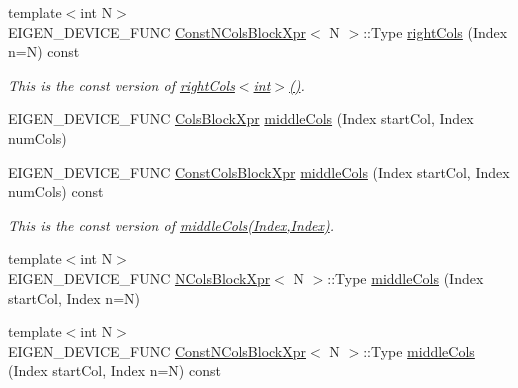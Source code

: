 \begin{DoxyCompactItemize}
\item 
\mbox{\label{class_eigen_1_1_dense_base_ab5ce663dcc3e656606ace064454e79fa}} 
{\footnotesize template$<$int N$>$ }\\E\+I\+G\+E\+N\+\_\+\+D\+E\+V\+I\+C\+E\+\_\+\+F\+U\+NC \mbox{\hyperlink{struct_eigen_1_1_dense_base_1_1_const_n_cols_block_xpr}{Const\+N\+Cols\+Block\+Xpr}}$<$ N $>$\+::Type \mbox{\hyperlink{class_eigen_1_1_dense_base_ab5ce663dcc3e656606ace064454e79fa}{right\+Cols}} (Index n=N) const
\begin{DoxyCompactList}\small\item\em This is the const version of \mbox{\hyperlink{class_eigen_1_1_dense_base_a5b0fa44c191d40a2f82260f7e5cdeaa9}{right\+Cols$<$int$>$()}}. \end{DoxyCompactList}\item 
E\+I\+G\+E\+N\+\_\+\+D\+E\+V\+I\+C\+E\+\_\+\+F\+U\+NC \mbox{\hyperlink{class_eigen_1_1_block}{Cols\+Block\+Xpr}} \mbox{\hyperlink{class_eigen_1_1_dense_base_a3fc39624015c1702d22ebb322aa9ebce}{middle\+Cols}} (Index start\+Col, Index num\+Cols)
\item 
\mbox{\label{class_eigen_1_1_dense_base_a9d892b4e54ac6f429a5f7a7b78ffa7bf}} 
E\+I\+G\+E\+N\+\_\+\+D\+E\+V\+I\+C\+E\+\_\+\+F\+U\+NC \mbox{\hyperlink{class_eigen_1_1_block}{Const\+Cols\+Block\+Xpr}} \mbox{\hyperlink{class_eigen_1_1_dense_base_a9d892b4e54ac6f429a5f7a7b78ffa7bf}{middle\+Cols}} (Index start\+Col, Index num\+Cols) const
\begin{DoxyCompactList}\small\item\em This is the const version of \mbox{\hyperlink{class_eigen_1_1_dense_base_a3fc39624015c1702d22ebb322aa9ebce}{middle\+Cols(\+Index,\+Index)}}. \end{DoxyCompactList}\item 
{\footnotesize template$<$int N$>$ }\\E\+I\+G\+E\+N\+\_\+\+D\+E\+V\+I\+C\+E\+\_\+\+F\+U\+NC \mbox{\hyperlink{struct_eigen_1_1_dense_base_1_1_n_cols_block_xpr}{N\+Cols\+Block\+Xpr}}$<$ N $>$\+::Type \mbox{\hyperlink{class_eigen_1_1_dense_base_a1c1a900f7a0e5b885f7af331b6678f70}{middle\+Cols}} (Index start\+Col, Index n=N)
\item 
\mbox{\label{class_eigen_1_1_dense_base_ab0829c0f80b185c762bf018665b2983f}} 
{\footnotesize template$<$int N$>$ }\\E\+I\+G\+E\+N\+\_\+\+D\+E\+V\+I\+C\+E\+\_\+\+F\+U\+NC \mbox{\hyperlink{struct_eigen_1_1_dense_base_1_1_const_n_cols_block_xpr}{Const\+N\+Cols\+Block\+Xpr}}$<$ N $>$\+::Type \mbox{\hyperlink{class_eigen_1_1_dense_base_ab0829c0f80b185c762bf018665b2983f}{middle\+Cols}} (Index start\+Col, Index n=N) const

\end{DoxyCompactItemize}
